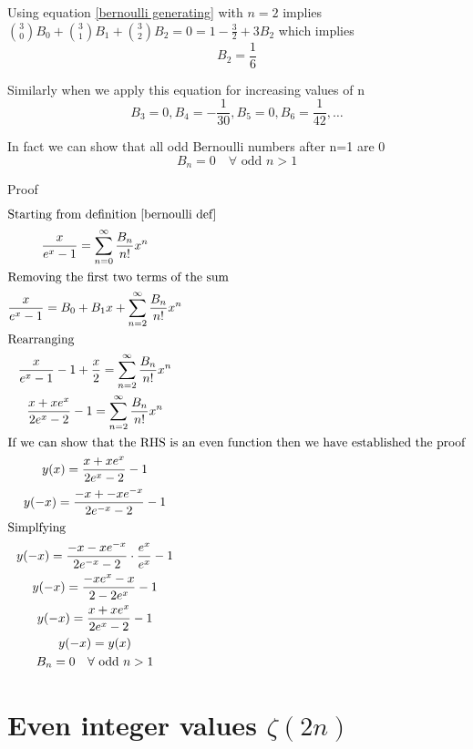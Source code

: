 \documentclass[a4paper]{article}
\begin{document}
Using equation \ref{bernoulli generating} with $n=2$ implies $ \binom{3}{0} B_0 + \binom{3}{1} B_1 + \binom{3}{2} B_2 = 0 = 1 - \frac{3}{2} + 3 B_2 $ which implies 
\begin{equation}
B_2 = \frac{1}{6}
\end{equation}

Similarly when we apply this equation for increasing values of n
\begin{equation}
B_3 = 0, B_4 = -\frac{1}{30}, B_5 = 0, B_6 = \frac{1}{42}, \dots
\end{equation}


\begin{theorem}
In fact we can show that all odd Bernoulli numbers after n=1 are 0
\begin{equation} \label{odd bernoulli} B_n = 0  \quad \forall \text{ odd }n > 1
\end{equation}

Proof
\begin{gather*}
\intertext{Starting from definition \ref{bernoulli def}}
\frac{x}{e^x -1} = \sum_{n=0}^{\infty} \frac{B_n}{n!} x^n
\\
\intertext{Removing the first two terms of the sum}
\frac{x}{e^x -1} = B_0 + B_1 x + \sum_{n=2}^{\infty} \frac{B_n}{n!} x^n\\
\intertext{Rearranging}
\frac{x}{e^x -1}  - 1 + \frac{x}{2}= \sum_{n=2}^{\infty} \frac{B_n}{n!} x^n
\\
\frac{x + xe^x}{2e^x -2}  - 1 = \sum_{n=2}^{\infty} \frac{B_n}{n!} x^n
\\
\intertext{If we can show that the RHS is an even function then we have established the proof}
y(x) = \frac{x + xe^x}{2e^x -2}  - 1
\\
y(-x) = \frac{-x + -xe^{-x}}{2e^{-x} -2}  - 1
\\
\intertext{Simplfying}
y(-x) = \frac{-x -xe^{-x}}{2e^{-x} -2} \cdot \frac{e^x}{e^x}  - 1
\\
y(-x) = \frac{-xe^x -x}{2 -2e^x}  - 1
\\
y(-x) = \frac{x+xe^x}{2e^x - 2}  - 1
\\
y(-x) = y(x)
\\
B_n = 0  \quad \forall \text{ odd }n > 1
\end{gather*}
\end{theorem}

\pagebreak

\section{Even integer values $\zeta(2n)$}
\end{document}
